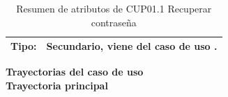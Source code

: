 \begin{table}[H]
\centering
\begin{tabular}{| l | p{12 cm} |}					
\hline
\textbf{Tipo:} & Secundario, viene del caso de uso \nameref{cu:CUP01}.\\
\hline	
\end{tabular}
\caption{Resumen de atributos de CUP01.1 Recuperar contraseña}
\label{tab:CUP01.1}
\end{table} 

\textbf{\textcolor[rgb]{0, 0, 0.545098}{Trayectorias del caso de uso}} \\

\textbf{\large{Trayectoria principal}}

